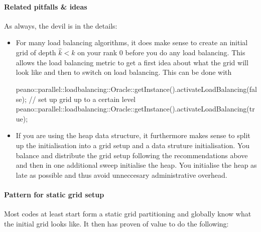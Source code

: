 \paragraph{Related pitfalls \& ideas}

As always, the devil is in the details:
\begin{itemize}
  \item  For many load balancing algorithms, it does make sense to create an
  initial grid of depth $\hat k <k$ on your rank 0 before you do any load
  balancing. This allows the load balancing metric to get a first idea about
  what the grid will look like and then to switch on load
  balancing. This can be done with
  \begin{code}
  peano::parallel::loadbalancing::Oracle::getInstance().activateLoadBalancing(false);
  // set up grid up to a certain level
  peano::parallel::loadbalancing::Oracle::getInstance().activateLoadBalancing(true);
  \end{code}









  \item If you are using the heap data structure, it furthermore makes sense to split up
the initialisation into a grid setup and a data struture initialisation.
You balance and distribute the grid setup following the recommendations above
and then in one additional sweep initialise the heap.
You initialise the heap as late as possible and thus avoid unneccesary
administrative overhead.
\end{itemize}


\paragraph{Pattern for static grid setup}

Most codes at least start form a static grid partitioning and globally know
what the initial grid looks like.
It then has proven of value to do the following:

